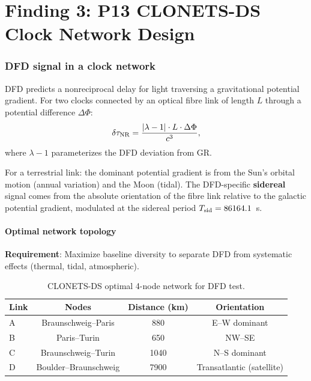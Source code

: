 \documentclass[11pt]{article}
\begin{document}
\part{Finding 3: P13 CLONETS-DS Clock Network Design}
\label{part:p13}

\section{DFD signal in a clock network}

DFD predicts a nonreciprocal delay for light traversing a gravitational
potential gradient. For two clocks connected by an optical fibre link
of length $L$ through a potential difference $\Delta\Phi$:
\begin{equation}
\delta\tau_{\rm NR} = \frac{|\lambda - 1| \cdot L \cdot \Delta\Phi}{c^3},
\end{equation}
where $\lambda - 1$ parameterizes the DFD deviation from GR.

For a terrestrial link: the dominant potential gradient is from the
Sun's orbital motion (annual variation) and the Moon (tidal). The
DFD-specific \textbf{sidereal} signal comes from the absolute
orientation of the fibre link relative to the galactic potential
gradient, modulated at the sidereal period $T_{\rm sid} = 86164.1$~s.

\subsection{Optimal network topology}

\textbf{Requirement}: Maximize baseline diversity to separate DFD
from systematic effects (thermal, tidal, atmospheric).

\begin{table}[H]
\centering
\caption{CLONETS-DS optimal 4-node network for DFD test.}
\begin{tabular}{@{}lccc@{}}
\toprule
Link & Nodes & Distance (km) & Orientation \\
\midrule
A & Braunschweig--Paris & 880 & E--W dominant \\
B & Paris--Turin & 650 & NW--SE \\
C & Braunschweig--Turin & 1040 & N--S dominant \\
D & Boulder--Braunschweig & 7900 & Transatlantic (satellite) \\
\bottomrule
\end{tabular}
\end{table}
\end{document}
